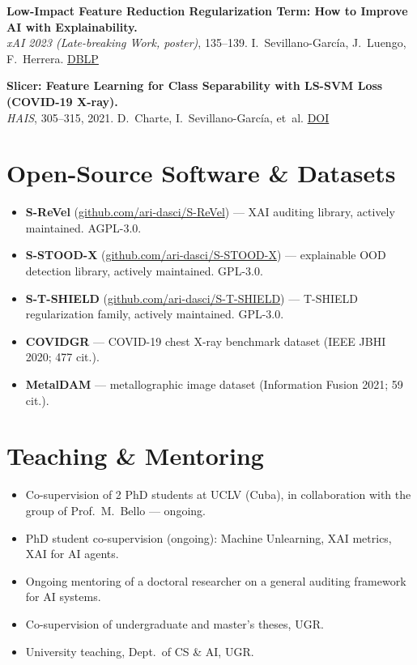 \documentclass[10pt,a4paper]{article}
\newcommand{\sub}[1]{\textcolor{subtle}{\footnotesize #1}}
\begin{document}
\textbf{Low-Impact Feature Reduction Regularization Term: How to Improve AI with Explainability.} \\
\sub{\textit{xAI 2023 (Late-breaking Work, poster)}, 135--139. I.~Sevillano-García, J.~Luengo, F.~Herrera. \href{https://dblp.org/rec/conf/xai/Sevillano-Garcia23}{DBLP}}

\textbf{Slicer: Feature Learning for Class Separability with LS-SVM Loss (COVID-19 X-ray).} \\
\sub{\textit{HAIS}, 305--315, 2021. D.~Charte, I.~Sevillano-García, et~al. \href{https://doi.org/10.1007/978-3-030-86271-8_26}{DOI}}

\normalsize

\section*{Open-Source Software \& Datasets}

\begin{itemize}
    \item \textbf{S-ReVel} (\href{https://github.com/ari-dasci/S-ReVel}{github.com/ari-dasci/S-ReVel}) --- XAI auditing library, actively maintained. AGPL-3.0.
    \item \textbf{S-STOOD-X} (\href{https://github.com/ari-dasci/S-STOOD-X}{github.com/ari-dasci/S-STOOD-X}) --- explainable OOD detection library, actively maintained. GPL-3.0.
    \item \textbf{S-T-SHIELD} (\href{https://github.com/ari-dasci/S-T-SHIELD}{github.com/ari-dasci/S-T-SHIELD}) --- T-SHIELD regularization family, actively maintained. GPL-3.0.
    \item \textbf{COVIDGR} --- COVID-19 chest X-ray benchmark dataset (IEEE JBHI 2020; 477 cit.).
    \item \textbf{MetalDAM} --- metallographic image dataset (Information Fusion 2021; 59 cit.).
\end{itemize}

\section*{Teaching \& Mentoring}

\begin{itemize}
    \item Co-supervision of 2 PhD students at UCLV (Cuba), in collaboration with the group of Prof.~M.~Bello --- ongoing.
    \item PhD student co-supervision (ongoing): Machine Unlearning, XAI metrics, XAI for AI agents.
    \item Ongoing mentoring of a doctoral researcher on a general auditing framework for AI systems.
    \item Co-supervision of undergraduate and master's theses, UGR.
    \item University teaching, Dept.~of CS \& AI, UGR.
\end{itemize}
\end{document}
